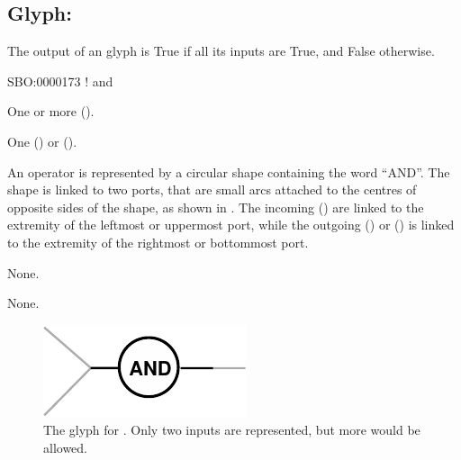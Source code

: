 \subsection{Glyph: }
\label{sec:and}

The output of an  glyph is True if all its inputs are True, and False otherwise.

\begin{glyphDescription}

\glyphSboTerm
SBO:0000173 ! and

\glyphIncoming One or more  ().

\glyphOutgoing
One  () or  ().

\glyphContainer
An  operator is represented by a circular shape containing the word ``AND''.
The shape is linked to two ports, that are small arcs attached to the centres of opposite sides of the shape, as shown in .
The incoming  () are linked to the extremity of the leftmost or uppermost port, while the outgoing  () or  () is linked to the extremity of the rightmost or bottommost port.

\glyphLabel
None.

\glyphAux
None.

\end{glyphDescription}

\begin{figure}[H]
  \centering
  \includegraphics{images/build/and.pdf}
  \caption{The \PD glyph for . Only two inputs are represented, but more would be allowed.}
  \label{fig:and}
\end{figure}
